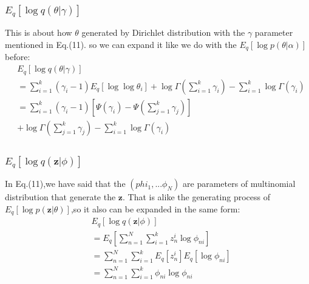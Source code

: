 \documentclass[12pt,a4paper]{article}
\begin{document}
\begin{CJK}{UTF8}{gbsn}
\subsubsection{$E_q[\log q(\theta|\gamma)]$}
This is about how $\theta$ generated by Dirichlet distribution with the $\gamma$ parameter mentioned in Eq.(11). so we can expand it like we do with the $E_q[\log p(\theta|\alpha)]$ before:
\begin{equation*}
\begin{split}
&E_q[\log q(\theta|\gamma)]\\
&= \sum_{i=1}^k(\gamma_i-1)E_q[\log \log \theta_i]
+ \log \Gamma(\sum_{i=1}^k\gamma_i) - \sum_{i=1}^k\log \Gamma(\gamma_i)\\
&= \sum_{i=1}^k(\gamma_i-1)[\Psi(\gamma_i) - \Psi(\sum_{j=1}^k\gamma_j)]\\
&+\log \Gamma(\sum_{j=1}^k\gamma_j) - \sum_{i=1}^k\log \Gamma(\gamma_i)\\
\end{split}
\end{equation*}
\subsubsection{$E_q[\log q(\textbf{z}|\phi)]$}
In Eq.(11),we have said that the $(phi_1,...\phi_N)$ are parameters of multinomial distribution that generate the $\bm{z}$. That is alike the generating process of $E_q[\log p(\bm{z}|\theta)]$,so it also can be expanded in the same form:
\begin{equation*}
\begin{split}
&E_q[\log q(\textbf{z}|\phi)]\\
&= E_q[\sum_{n=1}^N\sum_{i=1}^k z_{n}^i \log \phi_{ni}]\\
&= \sum_{n=1}^N\sum_{i=1}^k E_q[z_{n}^i]E_q[\log \phi_{ni}]\\
&= \sum_{n=1}^N\sum_{i=1}^k\phi_{ni}\log\phi_{ni}
\end{split}
\end{equation*}


\end{CJK}
\end{document}
